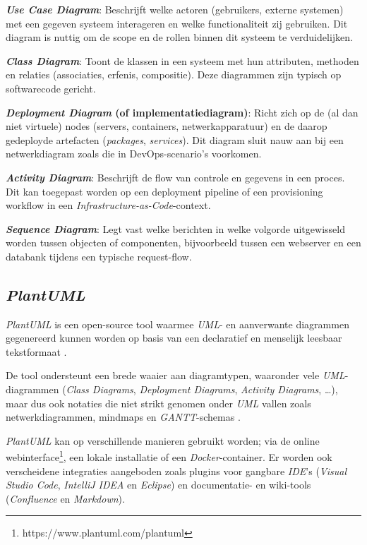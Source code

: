 \begin{description}
  \item \textbf{\emph{Use Case Diagram}}: Beschrijft welke actoren (gebruikers, externe systemen) met een gegeven systeem interageren en welke functionaliteit zij gebruiken. Dit diagram is nuttig om de scope en de rollen binnen dit systeem te verduidelijken.
  \item \textbf{\emph{Class Diagram}}: Toont de klassen in een systeem met hun attributen, methoden en relaties (associaties, erfenis, compositie). Deze diagrammen zijn typisch op softwarecode gericht.
  \item \textbf{\emph{Deployment Diagram} (of implementatiediagram)}: Richt zich op de (al dan niet virtuele) nodes (servers, containers, netwerkapparatuur) en de daarop gedeployde artefacten (\emph{packages}, \emph{services}). Dit diagram sluit nauw aan bij een netwerkdiagram zoals die in DevOps-scenario's voorkomen.
  \item \textbf{\emph{Activity Diagram}}: Beschrijft de flow van controle en gegevens in een proces. Dit kan toegepast worden op een deployment pipeline of een provisioning workflow in een \emph{Infrastructure-as-Code}-context.
  \item \textbf{\emph{Sequence Diagram}}: Legt vast welke berichten in welke volgorde uitgewisseld worden tussen objecten of componenten, bijvoorbeeld tussen een webserver en een databank tijdens een typische request-flow.
\end{description}

\subsection{\emph{PlantUML}}%

\emph{PlantUML} is een open-source tool waarmee \emph{UML}- en aanverwante diagrammen gegenereerd kunnen worden op basis van een declaratief en menselijk leesbaar tekstformaat \autocite{PlantUML2026}.

De tool ondersteunt een brede waaier aan diagramtypen, waaronder vele \emph{UML}-diagrammen (\emph{Class Diagrams}, \emph{Deployment Diagrams}, \emph{Activity Diagrams}, \ldots), maar dus ook notaties die niet strikt genomen onder \emph{UML} vallen zoals netwerkdiagrammen, mindmaps en \emph{GANTT}-schemas \autocite{PlantUML2025}.

\emph{PlantUML} kan op verschillende manieren gebruikt worden; via de online webinterface\footnote{https://www.plantuml.com/plantuml}, een lokale installatie of een \emph{Docker}-container. Er worden ook verscheidene integraties aangeboden zoals plugins voor gangbare \emph{IDE}'s (\emph{Visual Studio Code}, \emph{IntelliJ IDEA} en \emph{Eclipse}) en documentatie- en wiki-tools (\emph{Confluence} en \emph{Markdown}).

